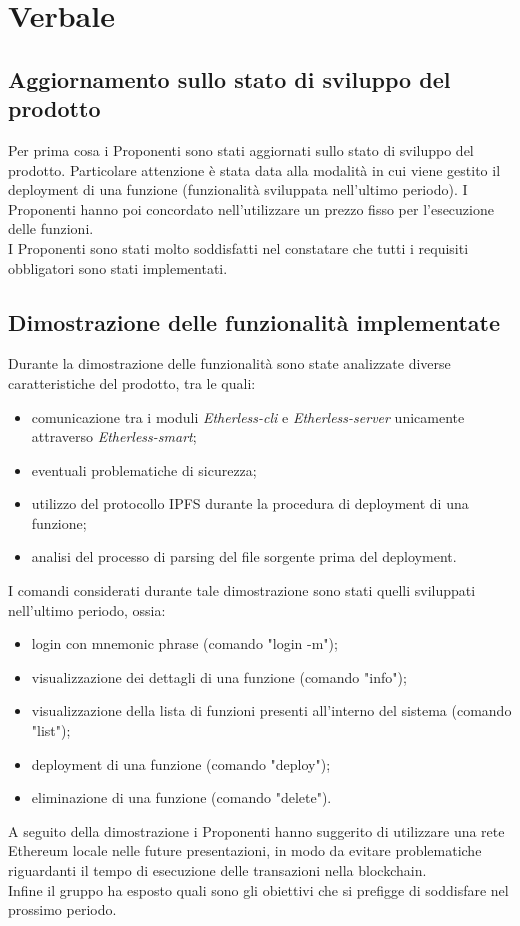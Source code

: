 \section{Verbale}
\subsection{Aggiornamento sullo stato di sviluppo del prodotto}
Per prima cosa i Proponenti sono stati aggiornati sullo stato di sviluppo del prodotto. Particolare attenzione è stata data alla modalità in cui viene gestito il deployment di una funzione (funzionalità sviluppata nell'ultimo periodo). I Proponenti hanno poi concordato nell'utilizzare un prezzo fisso per l'esecuzione delle funzioni. 
\\ 
I Proponenti sono stati molto soddisfatti nel constatare che tutti i requisiti obbligatori sono stati implementati. 

\subsection{Dimostrazione delle funzionalità implementate}
Durante la dimostrazione delle funzionalità sono state analizzate diverse caratteristiche del prodotto, tra le quali: 
\begin{itemize}
	\item comunicazione tra i moduli \textit{Etherless-cli} e 	\textit{Etherless-server} unicamente attraverso \textit{Etherless-smart}; 
	\item eventuali problematiche di sicurezza; 
	\item utilizzo del protocollo IPFS durante la procedura di deployment di una funzione; 
	\item analisi del processo di parsing del file sorgente prima del deployment. 
\end{itemize}
I comandi considerati durante tale dimostrazione sono stati quelli sviluppati nell'ultimo periodo, ossia: 
\begin{itemize}
	\item login con mnemonic phrase (comando "login -m"); 
	\item visualizzazione dei dettagli di una funzione (comando "info"); 
	\item visualizzazione della lista di funzioni presenti all'interno del sistema (comando "list"); 
	\item deployment di una funzione (comando "deploy"); 
	\item eliminazione di una funzione (comando "delete"). 
\end{itemize}
A seguito della dimostrazione i Proponenti hanno suggerito di utilizzare una rete Ethereum locale nelle future presentazioni, in modo da evitare problematiche riguardanti il tempo di esecuzione delle transazioni nella blockchain. \\ 
Infine il gruppo ha esposto quali sono gli obiettivi che si prefigge di soddisfare nel prossimo periodo. 
